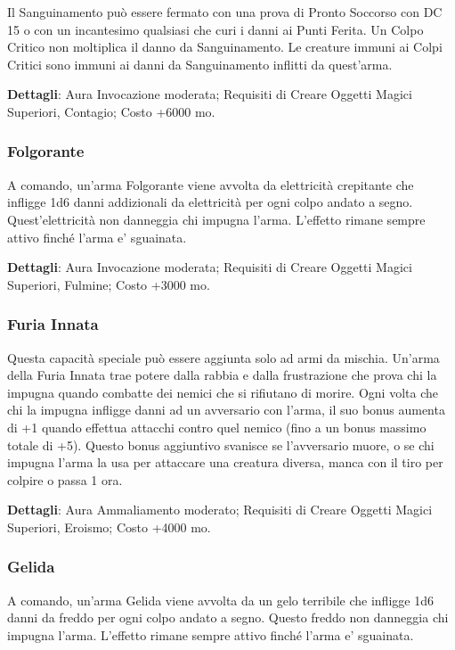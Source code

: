 \begin{multicols}{2}
Il Sanguinamento può essere fermato con una prova di Pronto Soccorso con DC 15 o con un incantesimo qualsiasi che curi i danni ai Punti Ferita. Un Colpo Critico non moltiplica il danno da Sanguinamento. Le creature immuni ai Colpi Critici sono immuni ai danni da Sanguinamento inflitti da quest'arma.

\textbf{Dettagli}: Aura Invocazione moderata; Requisiti di Creare Oggetti Magici Superiori, Contagio; Costo +6000 mo.

\subsubsection{Folgorante}

A comando, un'arma Folgorante viene avvolta da elettricità crepitante che infligge 1d6 danni addizionali da elettricità per ogni colpo andato a segno. Quest'elettricità non danneggia chi impugna l'arma. L'effetto rimane sempre attivo finché l'arma e' sguainata.

\textbf{Dettagli}: Aura Invocazione moderata; Requisiti di Creare Oggetti Magici Superiori, Fulmine; Costo +3000 mo.

\subsubsection{Furia Innata}

Questa capacità speciale può essere aggiunta solo ad armi da mischia. Un'arma della Furia Innata trae potere dalla rabbia e dalla frustrazione che prova chi la impugna quando combatte dei nemici che si rifiutano di morire. Ogni volta che chi la impugna infligge danni ad un avversario con l'arma, il suo bonus aumenta di +1 quando effettua attacchi contro quel nemico (fino a un bonus massimo totale di +5). Questo bonus aggiuntivo svanisce se l'avversario muore, o se chi impugna l'arma la usa per attaccare una creatura diversa, manca con il tiro per colpire o passa 1 ora.

\textbf{Dettagli}: Aura Ammaliamento moderato; Requisiti di Creare Oggetti Magici Superiori, Eroismo; Costo +4000 mo.

\subsubsection{Gelida}

A comando, un'arma Gelida viene avvolta da un gelo terribile che infligge 1d6 danni da freddo per ogni colpo andato a segno. Questo freddo non danneggia chi impugna l'arma. L'effetto rimane sempre attivo finché l'arma e' sguainata.


\end{multicols}

